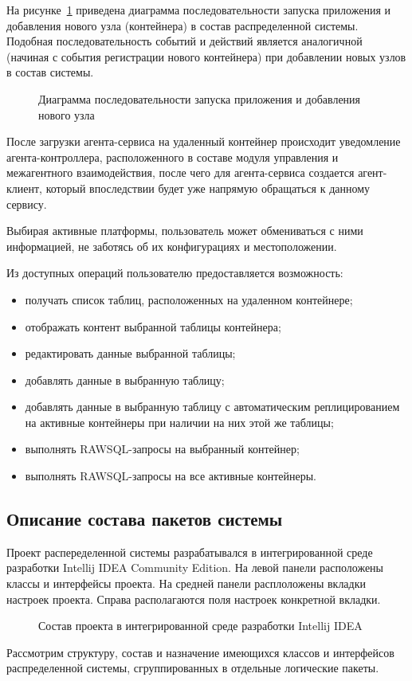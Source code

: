 	На рисунке~\ref{3:seq-launch} приведена диаграмма последовательности запуска приложения и добавления нового узла (контейнера) в состав распределенной системы. Подобная последовательность событий и действий является аналогичной (начиная с события регистрации нового контейнера) при добавлении новых узлов в состав системы.

\begin{figure}[h!]
\caption{Диаграмма последовательности запуска приложения и добавления нового узла}
\label{3:seq-launch}
\end{figure}

После загрузки агента-сервиса на удаленный контейнер происходит уведомление агента-контроллера, расположенного в составе модуля управления и  межагентного взаимодействия, после чего для агента-сервиса создается агент-клиент, который впоследствии будет уже напрямую обращаться к данному сервису.

Выбирая активные платформы, пользователь может обмениваться с ними информацией, не заботясь об их конфигурациях и местоположении.

Из доступных операций пользователю предоставляется возможность:
\begin{itemize}
\item получать список таблиц, расположенных на удаленном контейнере;
\item отображать контент выбранной таблицы контейнера;
\item редактировать данные выбранной таблицы;
\item добавлять данные в выбранную таблицу;
\item добавлять данные в выбранную таблицу с автоматическим реплицированием на активные контейнеры при наличии на них этой же таблицы;
\item выполнять RAWSQL-запросы на выбранный контейнер;
\item выполнять RAWSQL-запросы на все активные контейнеры.
\end{itemize}

\subsection{Описание состава пакетов системы}
Проект распеределенной системы разрабатывался в интегрированной среде разработки Intellij IDEA Community Edition. На левой панели расположены классы и интерфейсы проекта. На средней панели расплоложены вкладки настроек проекта. Справа располагаются поля настроек конкретной вкладки.
\begin{figure}[h!]
\caption{Состав проекта в интегрированной среде разработки Intellij IDEA}
\label{3:ide}
\end{figure}
Рассмотрим структуру, состав и назначение имеющихся классов и интерфейсов распределенной системы, сгруппированных в отдельные логические пакеты.

